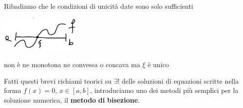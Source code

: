 \documentclass[12pt]{article}
\begin{document}
Ribadiamo che le condizioni di unicità date sono solo sufficienti 
\begin{center}
            \includegraphics[width=0.3\textwidth]{pagina8_1.png}\par
\end{center}
\begin{center}
non è ne monotona ne convessa o concava ma $\xi$ è unico\\
\end{center}
Fatti questi brevi richiami teorici su $\exists!$ delle soluzioni di equazioni scritte nella forma $f(x)=0$, $x \in [a,b]$, introduciamo uno dei metodi più semplici per la soluzione numerica, il \textbf{metodo} \textbf{di} \textbf{bisezione}.
\end{document}
